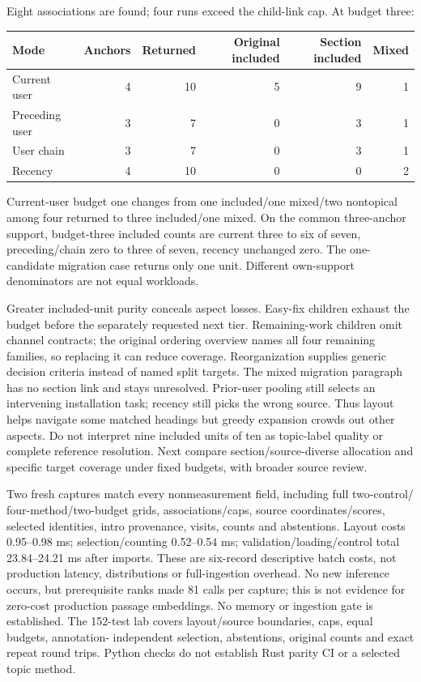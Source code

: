 \documentclass[11pt]{article}
\begin{document}
Eight associations are found; four runs exceed the child-link cap. At budget three:
\begin{center}
\begin{tabular}{lrrrrr}
\hline
Mode & Anchors & Returned & Original included & Section included & Mixed \\
\hline
Current user & 4 & 10 & 5 & 9 & 1 \\
Preceding user & 3 & 7 & 0 & 3 & 1 \\
User chain & 3 & 7 & 0 & 3 & 1 \\
Recency & 4 & 10 & 0 & 0 & 2 \\
\hline
\end{tabular}
\end{center}
Current-user budget one changes from one included/one mixed/two nontopical among
four returned to three included/one mixed. On the common three-anchor support,
budget-three included counts are current three to six of seven, preceding/chain
zero to three of seven, recency unchanged zero. The one-candidate migration case
returns only one unit. Different own-support denominators are not equal workloads.

Greater included-unit purity conceals aspect losses. Easy-fix children exhaust the
budget before the separately requested next tier. Remaining-work children omit
channel contracts; the original ordering overview names all four remaining
families, so replacing it can reduce coverage. Reorganization supplies generic
decision criteria instead of named split targets. The mixed migration paragraph
has no section link and stays unresolved. Prior-user pooling still selects an
intervening installation task; recency still picks the wrong source. Thus layout
helps navigate some matched headings but greedy expansion crowds out other aspects.
Do not interpret nine included units of ten as topic-label quality or complete
reference resolution. Next compare section/source-diverse allocation and specific
target coverage under fixed budgets, with broader source review.

Two fresh captures match every nonmeasurement field, including full two-control/
four-method/two-budget grids, associations/caps, source coordinates/scores, selected
identities, intro provenance, visits, counts and abstentions. Layout costs
0.95--0.98 ms; selection/counting 0.52--0.54 ms; validation/loading/control total
23.84--24.21 ms after imports. These are six-record descriptive batch costs,
not production latency, distributions or full-ingestion overhead. No new inference
occurs, but prerequisite ranks made 81 calls per capture; this is not evidence for
zero-cost production passage embeddings. No memory or ingestion gate is established.
The 152-test lab covers layout/source boundaries, caps, equal budgets, annotation-
independent selection, abstentions, original counts and exact repeat round trips.
Python checks do not establish Rust parity CI or a selected topic method.
\end{document}
